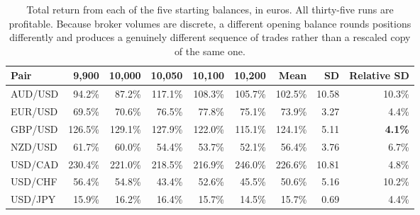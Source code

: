 \begin{table}[htb!]
\centering
\footnotesize
\begin{tabular}{@{}lrrrrrrrr@{}}
\toprule
\textbf{Pair} & \textbf{9,900} & \textbf{10,000} & \textbf{10,050} & \textbf{10,100} & \textbf{10,200} & \textbf{Mean} & \textbf{SD} & \textbf{Relative SD} \\
\midrule
AUD/USD & 94.2\% & 87.2\% & 117.1\% & 108.3\% & 105.7\% & 102.5\% & 10.58 & 10.3\% \\
EUR/USD & 69.5\% & 70.6\% & 76.5\% & 77.8\% & 75.1\% & 73.9\% & 3.27 & 4.4\% \\
GBP/USD & 126.5\% & 129.1\% & 127.9\% & 122.0\% & 115.1\% & 124.1\% & 5.11 & \textbf{4.1\%} \\
NZD/USD & 61.7\% & 60.0\% & 54.4\% & 53.7\% & 52.1\% & 56.4\% & 3.76 & 6.7\% \\
USD/CAD & 230.4\% & 221.0\% & 218.5\% & 216.9\% & 246.0\% & 226.6\% & 10.81 & 4.8\% \\
USD/CHF & 56.4\% & 54.8\% & 43.4\% & 52.6\% & 45.5\% & 50.6\% & 5.16 & 10.2\% \\
USD/JPY & 15.9\% & 16.2\% & 16.4\% & 15.7\% & 14.5\% & 15.7\% & 0.69 & 4.4\% \\
\bottomrule
\end{tabular}
\caption{Total return from each of the five starting balances, in euros. All thirty-five runs are profitable. Because broker volumes are discrete, a different opening balance rounds positions differently and produces a genuinely different sequence of trades rather than a rescaled copy of the same one.}
\label{Tables:PathRobustness}
\end{table}